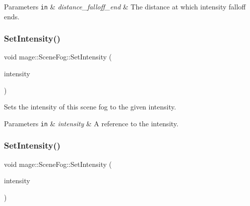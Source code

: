 \begin{DoxyParams}[1]{Parameters}
\mbox{\tt in}  & {\em distance\+\_\+falloff\+\_\+end} & The distance at which intensity falloff ends. \\
\hline
\end{DoxyParams}
\hypertarget{structmage_1_1_scene_fog_ac561984466dce2dfe4b0cdfe3c2fde2c}{}\label{structmage_1_1_scene_fog_ac561984466dce2dfe4b0cdfe3c2fde2c} 
\subsubsection{\texorpdfstring{Set\+Intensity()}{SetIntensity()}\hspace{0.1cm}{\footnotesize\ttfamily [1/2]}}
{\footnotesize\ttfamily void mage\+::\+Scene\+Fog\+::\+Set\+Intensity (\begin{DoxyParamCaption}\item[{const \hyperlink{structmage_1_1_r_g_b_spectrum}{R\+G\+B\+Spectrum} \&}]{intensity }\end{DoxyParamCaption})\hspace{0.3cm}{\ttfamily [noexcept]}}

Sets the intensity of this scene fog to the given intensity.


\begin{DoxyParams}[1]{Parameters}
\mbox{\tt in}  & {\em intensity} & A reference to the intensity. \\
\hline
\end{DoxyParams}
\hypertarget{structmage_1_1_scene_fog_aa953b6e08e2f6bcecfbb906959e876ea}{}\label{structmage_1_1_scene_fog_aa953b6e08e2f6bcecfbb906959e876ea} 
\subsubsection{\texorpdfstring{Set\+Intensity()}{SetIntensity()}\hspace{0.1cm}{\footnotesize\ttfamily [2/2]}}
{\footnotesize\ttfamily void mage\+::\+Scene\+Fog\+::\+Set\+Intensity (\begin{DoxyParamCaption}\item[{\hyperlink{structmage_1_1_r_g_b_spectrum}{R\+G\+B\+Spectrum} \&\&}]{intensity }\end{DoxyParamCaption})\hspace{0.3cm}{\ttfamily [noexcept]}}

